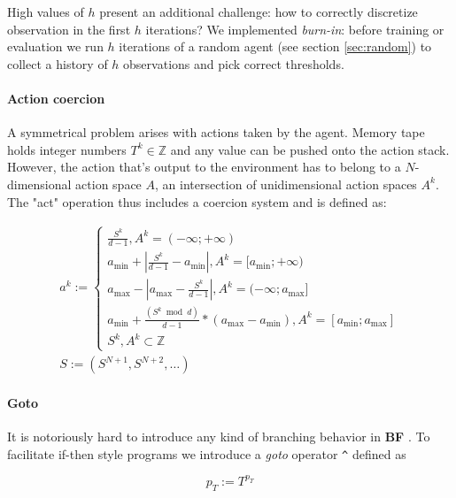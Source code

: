 High values of $h$ present an additional challenge: how to correctly discretize observation in the first $h$ iterations?
We implemented \textit{burn-in}: before training or evaluation we run $h$ iterations of a random agent (see section \ref{sec:random}) to collect a history of $h$ observations and pick correct thresholds.

\paragraph{Action coercion}
\label{sec:act}

A symmetrical problem arises with actions taken by the agent. 
Memory tape holds integer numbers $T^k \in \mathbb{Z}$ and any value can be pushed onto the action stack.
However, the action that's output to the environment has to belong to a $N$-dimensional action space $A$, an intersection of unidimensional action spaces $A^k$.
The "act" operation thus includes a coercion system and is defined as:

\begin{equation}
\label{eq:act}
\begin{array}{l}
    a^k := \begin{cases}
\frac{S^k}{d-1}, A^k = (- \infty; + \infty) \\
a_{\text{min}} + |\frac{S^k}{d-1} - a_{\text{min}}|, A^k = [a_{\text{min}}; + \infty) \\
a_{\text{max}} - |a_{\text{max}} - \frac{S^k}{d-1}|, A^k = (- \infty; a_{\text{max}}] \\
a_{\text{min}} + \frac{(S^k \bmod d)}{d - 1} * (a_{\text{max}} - a_{\text{min}}), A^k = [a_{\text{min}}; a_{\text{max}}] \\
S^k, A^k \subset \mathbb{Z}
\end{cases} \\
    S := (S^{N+1}, S^{N+2}, \dots)
\end{array}
\end{equation}

\paragraph{Goto}
\label{sec:goto}

It is notoriously hard to introduce any kind of branching behavior in \textbf{BF} \cite{linanderControlFlowBrainfuck2016}.
To facilitate if-then style programs we introduce a \textit{goto} operator \verb|^| defined as 

\begin{equation}
   p_T := T^{p_T} 
\end{equation}

